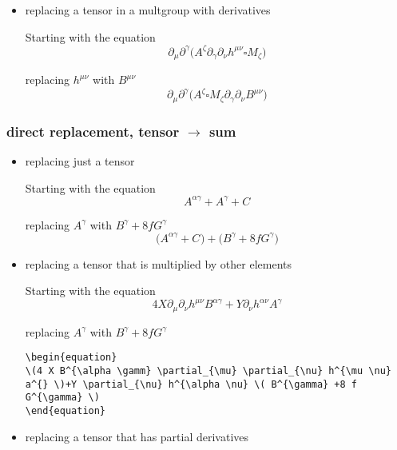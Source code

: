 \documentclass{article}
\def\){\Big)}
\def\({\Big(}
\begin{document}
{\begin{itemize}
\item{replacing a tensor in a multgroup with derivatives}


Starting with the equation
\begin{equation}
\partial_{\mu} \partial^{\gamma}\(A^{\zeta} \partial_{\gamma} \partial_{\nu} h^{\mu \nu} \square M_{\zeta}\)
\end{equation}

replacing $ h^{\mu \nu} $ with $ B^{\mu \nu} $
\begin{equation}
\partial_{\mu} \partial^{\gamma} \( A^{\zeta} \square M_{\zeta} \partial_{\gamma} \partial_{\nu} B^{\mu \nu} \)
\end{equation}

\end{itemize}

\subsubsection{direct replacement, tensor $\rightarrow$ sum}

\begin{itemize}



\item{replacing just a tensor}

Starting with the equation
\begin{equation}
A^{\alpha \gamma} +  A^{\gamma}  + C^{} 
\end{equation}

replacing $ A^{\gamma} $ with $ B^{\gamma} + 8fG^{\gamma} $
\begin{equation}
\( A^{\alpha \gamma} + C^{} \)+\( B^{\gamma} +8 f G^{\gamma} \)
\end{equation}


\item{replacing a tensor that is multiplied by other elements}

{\color{red}
Starting with the equation
\begin{equation}
4 X \partial_{\mu} \partial_{\nu} h^{\mu \nu} B^{\alpha \gamma} +Y \partial_{\nu} h^{\alpha \nu} A^{\gamma}
\end{equation}

replacing $ A^{\gamma} $ with $ B^{\gamma} + 8fG^{\gamma} $
\begin{verbatim}
\begin{equation}
\(4 X B^{\alpha \gamm} \partial_{\mu} \partial_{\nu} h^{\mu \nu} a^{} \)+Y \partial_{\nu} h^{\alpha \nu} \( B^{\gamma} +8 f G^{\gamma} \)
\end{equation}
\end{verbatim}
}
\item{replacing a tensor that has partial derivatives}


\end{itemize}}
\end{document}
